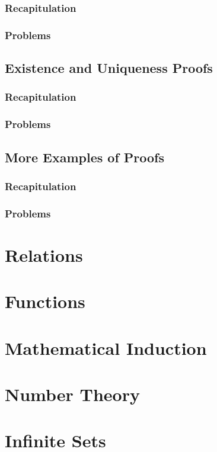 \documentclass{report}
\begin{document}
        \subsection{Recapitulation}
        
        \subsection{Problems}
        
    \section{Existence and Uniqueness Proofs}
        \subsection{Recapitulation}
        \subsection{Problems}
    \section{More Examples of Proofs}
        \subsection{Recapitulation}
        \subsection{Problems}

\chapter{Relations}

\chapter{Functions}

\chapter{Mathematical Induction}

\chapter{Number Theory}

\chapter{Infinite Sets}
\end{document}
